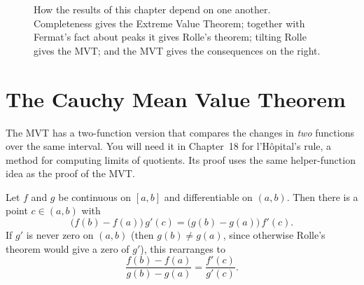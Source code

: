 \begin{figure}[htbp]
\centering
{}
\caption{How the results of this chapter depend on one another. Completeness gives
the Extreme Value Theorem; together with Fermat's fact about peaks it gives Rolle's
theorem; tilting Rolle gives the MVT; and the MVT gives the consequences on the
right.}
\label{ch15:fig-chain}
\end{figure}

\section{The Cauchy Mean Value Theorem}

The MVT has a two-function version that compares the changes in \emph{two}
functions over the same interval. You will need it in Chapter~18 for l'H\^opital's
rule, a method for computing limits of quotients. Its proof uses the same
helper-function idea as the proof of the MVT.

\begin{theorem}\label{ch15:thm-cauchy}
Let $f$ and $g$ be continuous on $[a,b]$ and differentiable on $(a,b)$. Then there
is a point $c\in(a,b)$ with
\[
  \bigl(f(b)-f(a)\bigr)\,g'(c)=\bigl(g(b)-g(a)\bigr)\,f'(c).
\]
If $g'$ is never zero on $(a,b)$ (then $g(b)\ne g(a)$, since otherwise Rolle's
theorem would give a zero of $g'$), this rearranges to
\[
  \frac{f(b)-f(a)}{g(b)-g(a)}=\frac{f'(c)}{g'(c)}.
\]
\end{theorem}

